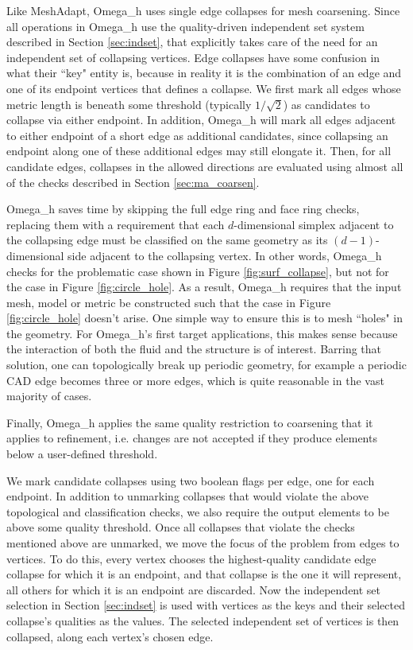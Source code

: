 Like MeshAdapt, Omega\_h uses single edge collapses
for mesh coarsening.
Since all operations in Omega\_h use the quality-driven
independent set system described in Section \ref{sec:indset},
that explicitly takes care of the need for an independent
set of collapsing vertices.
Edge collapses have some confusion in what their ``key" entity is,
because in reality it is the combination of an edge and one
of its endpoint vertices that defines a collapse.
We first mark all edges whose metric length is beneath
some threshold (typically $1/\sqrt{2}$) as candidates to collapse
via either endpoint.
In addition, Omega\_h will mark all edges adjacent to either endpoint
of a short edge as additional candidates, since collapsing an endpoint
along one of these additional edges may still elongate it.
Then, for all candidate edges, collapses in the allowed directions are evaluated
using almost all of the checks described in Section \ref{sec:ma_coarsen}.

Omega\_h saves time by skipping the full edge ring and face
ring checks, replacing them with a requirement that each $d$-dimensional simplex
adjacent to the collapsing edge must be classified on the same geometry
as its $(d-1)$-dimensional side adjacent to the collapsing vertex.
In other words, Omega\_h checks for the problematic case shown in Figure
\ref{fig:surf_collapse}, but not for the case in Figure \ref{fig:circle_hole}.
As a result, Omega\_h requires that the input mesh, model or metric be
constructed such that the case in Figure \ref{fig:circle_hole} doesn't arise.
One simple way to ensure this is to mesh ``holes" in the geometry.
For Omega\_h's first target applications,
this makes sense because the interaction of both the fluid and the structure
is of interest.
Barring that solution, one can topologically break up periodic geometry,
for example a periodic CAD edge becomes three or more edges,
which is quite reasonable in the vast majority of cases.

Finally, Omega\_h applies the same quality restriction to coarsening
that it applies to refinement, i.e. changes are not accepted if they produce elements
below a user-defined threshold.

We mark candidate collapses using two boolean flags per edge, one for each
endpoint.
In addition to unmarking collapses that would violate the above topological
and classification checks, we also require the output elements to be
above some quality threshold.
Once all collapses that violate the checks mentioned above are unmarked,
we move the focus of the problem from edges to vertices.
To do this, every vertex chooses the highest-quality candidate edge collapse
for which it is an endpoint, and that collapse is the one it will
represent, all others for which it is an endpoint are discarded.
Now the independent set selection in Section \ref{sec:indset} is used
with vertices as the keys and their selected collapse's qualities as the
values.
The selected independent set of vertices is then collapsed, along each
vertex's chosen edge.

